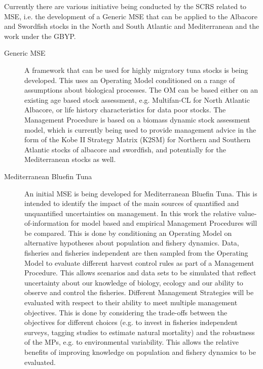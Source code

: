\documentclass[a4paper,10pt]{article}
\begin{document}
Currently there are various initiative being conducted by the SCRS related to MSE, i.e. the development of a Generic MSE
that can be applied to the Albacore and Swordfish stocks in the North and South Atlantic and Mediterranean and the work 
under the GBYP.

  \begin{description}
    \item[Generic MSE] A framework that can be used for highly migratory tuna stocks is being developed.
    This uses an Operating Model conditioned on a range of assumptions about biological processes. The OM can be based either 
    on an existing age based stock assessment, e.g. Multifan-CL for North Atlantic Albacore, or life history
    characteristics for data poor stocks. The Management Procedure is based on a biomass dynamic stock assessment model,
    which is currently being used to provide management advice in the form of the Kobe II Strategy Matrix (K2SM) for 
    Northern and Southern Atlantic stocks of albacore and swordfish, and potentially for the Mediterranean stocks as well.

    \item[Mediterranean Bluefin Tuna] 
    An initial MSE is being developed for Mediterranean Bluefin Tuna. This is intended to identify the
    impact of the main sources of quantified and unquantified uncertainties on management.
    In this work the relative value-of-information for model based and empirical Management Procedures will be compared. 
    This is done by conditioning an
    Operating Model on alternative hypotheses about population and fishery dynamics. Data, fisheries and
    fisheries independent are then sampled from the Operating Model to evaluate different harvest control rules as
    part of a Management Procedure. This allows scenarios and data sets to be simulated that reflect
    uncertainty about our knowledge of biology, ecology and our ability to observe and control the fisheries.
    Different Management Strategies will be evaluated with respect to their ability to meet multiple
    management objectives. This is done by considering the trade-offs between the objectives for different
    choices (e.g. to invest in fisheries independent surveys, tagging studies to estimate natural mortality) and
    the robustness of the MPs, e.g. to environmental variability. This allows the relative benefits of improving
    knowledge on population and fishery dynamics to be evaluated.
  \end{description}
\end{document}
